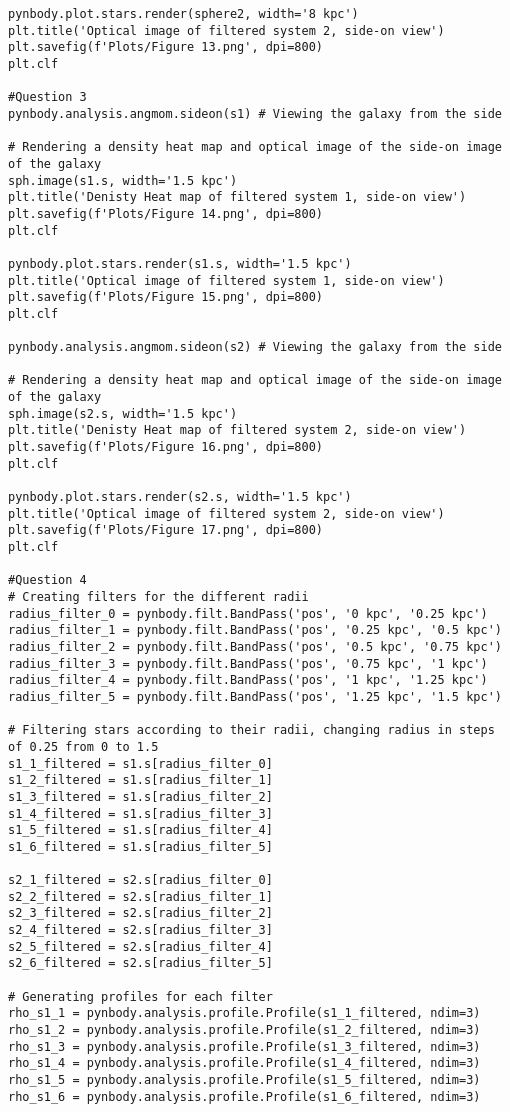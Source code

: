 \documentclass[12pt, a4paper]{article}
\begin{document}
\begin{lstlisting}[language=iPython]
pynbody.plot.stars.render(sphere2, width='8 kpc')
plt.title('Optical image of filtered system 2, side-on view')
plt.savefig(f'Plots/Figure 13.png', dpi=800)
plt.clf
  
#Question 3
pynbody.analysis.angmom.sideon(s1) # Viewing the galaxy from the side
  
# Rendering a density heat map and optical image of the side-on image of the galaxy
sph.image(s1.s, width='1.5 kpc')
plt.title('Denisty Heat map of filtered system 1, side-on view')
plt.savefig(f'Plots/Figure 14.png', dpi=800)
plt.clf
  
pynbody.plot.stars.render(s1.s, width='1.5 kpc')
plt.title('Optical image of filtered system 1, side-on view')
plt.savefig(f'Plots/Figure 15.png', dpi=800)
plt.clf
  
pynbody.analysis.angmom.sideon(s2) # Viewing the galaxy from the side
  
# Rendering a density heat map and optical image of the side-on image of the galaxy
sph.image(s2.s, width='1.5 kpc')
plt.title('Denisty Heat map of filtered system 2, side-on view')
plt.savefig(f'Plots/Figure 16.png', dpi=800)
plt.clf
  
pynbody.plot.stars.render(s2.s, width='1.5 kpc')
plt.title('Optical image of filtered system 2, side-on view')
plt.savefig(f'Plots/Figure 17.png', dpi=800)
plt.clf
  
#Question 4
# Creating filters for the different radii
radius_filter_0 = pynbody.filt.BandPass('pos', '0 kpc', '0.25 kpc')
radius_filter_1 = pynbody.filt.BandPass('pos', '0.25 kpc', '0.5 kpc')
radius_filter_2 = pynbody.filt.BandPass('pos', '0.5 kpc', '0.75 kpc')
radius_filter_3 = pynbody.filt.BandPass('pos', '0.75 kpc', '1 kpc')
radius_filter_4 = pynbody.filt.BandPass('pos', '1 kpc', '1.25 kpc')
radius_filter_5 = pynbody.filt.BandPass('pos', '1.25 kpc', '1.5 kpc')
  
# Filtering stars according to their radii, changing radius in steps of 0.25 from 0 to 1.5
s1_1_filtered = s1.s[radius_filter_0]
s1_2_filtered = s1.s[radius_filter_1]
s1_3_filtered = s1.s[radius_filter_2]
s1_4_filtered = s1.s[radius_filter_3]
s1_5_filtered = s1.s[radius_filter_4]
s1_6_filtered = s1.s[radius_filter_5]
  
s2_1_filtered = s2.s[radius_filter_0]
s2_2_filtered = s2.s[radius_filter_1]
s2_3_filtered = s2.s[radius_filter_2]
s2_4_filtered = s2.s[radius_filter_3]
s2_5_filtered = s2.s[radius_filter_4]
s2_6_filtered = s2.s[radius_filter_5]
  
# Generating profiles for each filter
rho_s1_1 = pynbody.analysis.profile.Profile(s1_1_filtered, ndim=3)
rho_s1_2 = pynbody.analysis.profile.Profile(s1_2_filtered, ndim=3)
rho_s1_3 = pynbody.analysis.profile.Profile(s1_3_filtered, ndim=3)
rho_s1_4 = pynbody.analysis.profile.Profile(s1_4_filtered, ndim=3)
rho_s1_5 = pynbody.analysis.profile.Profile(s1_5_filtered, ndim=3)
rho_s1_6 = pynbody.analysis.profile.Profile(s1_6_filtered, ndim=3)
  

\end{lstlisting}
\end{document}
